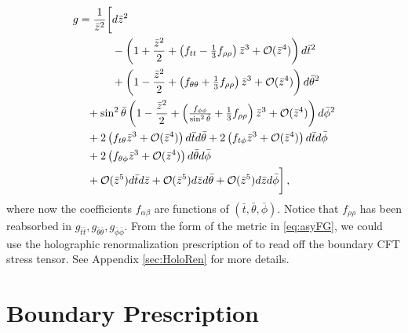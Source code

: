 \documentclass[aps,letterpaper,twocolumn,nofootinbib]{revtex4}
\numberwithin{equation}{section}
\begin{document}
\begin{align}
g=\frac{1}{\bar{z}^2}\biggl[ 
&d\bar{z}^2 \nonumber \\
&-\left(1+\frac{\bar{z}^2}{2}+\left( \textstyle{f_{tt}-\frac{1}{3}f_{\rho\rho}}\right)\bar{z}^3+\mathcal{O}(\bar{z}^4) \right)d\bar{t}^2 \nonumber \\
&+ \left(1-\frac{\bar{z}^2}{2}+\left(\textstyle{f_{\theta\theta}+\frac{1}{3}f_{\rho\rho}} \right)\bar{z}^3 +\mathcal{O}(\bar{z}^4)\right)d\bar{\theta}^2\nonumber\\
&\hspace{-0.8cm} +  \sin^2\bar{\theta} \left(1-\frac{\bar{z}^2}{2}+\left(\textstyle{\frac{f_{\phi\phi}}{ \sin^2\bar{\theta}}+\frac{1}{3}f_{\rho\rho}}\right)\bar{z}^3 +\mathcal{O}(\bar{z}^4)\right)d\bar{\phi}^2\nonumber\\
&\hspace{-0.8cm}+ 2 \left(f_{t\theta}\bar{z}^3 +\mathcal{O}(\bar{z}^4) \right) d\bar{t} d\bar{\theta} + 2 \left( f_{t\phi}\bar{z}^3 +\mathcal{O}(\bar{z}^4)\right)d\bar{t} d\bar{\phi} \nonumber \\
&\hspace{-0.8cm}+ 2\left( f_{\theta\phi} \bar{z}^3+\mathcal{O}(\bar{z}^4)\right)d\bar{\theta} d\bar{\phi} 
\nonumber\\
&\hspace{-0.8cm}+\mathcal{O}(\bar{z}^5)d\bar{t}d\bar{z}+\mathcal{O}(\bar{z}^5)d\bar{z}d\bar{\theta}+\mathcal{O}(\bar{z}^5)d\bar{z}d\bar{\phi}
\biggr]\,,
\label{eq:asyFG}
\end{align}
where now the coefficients $f_{\alpha\beta}$ are functions of $(\bar t, \bar\theta, \bar\phi)$. 
Notice that $f_{\rho\rho}$ has been reabsorbed in $g_{\bar{t}\bar{t}}, g_{\bar{\theta}\bar{\theta}}, g_{\bar{\phi}\bar{\phi}}$. From the form of the metric in \eqref{eq:asyFG}, we could use the holographic renormalization prescription of \cite{deHaro:2000vlm} to read off the boundary CFT stress tensor. See Appendix \ref{sec:HoloRen} for more details.



\section{Boundary Prescription}\label{sec:pre_sta}
\end{document}

